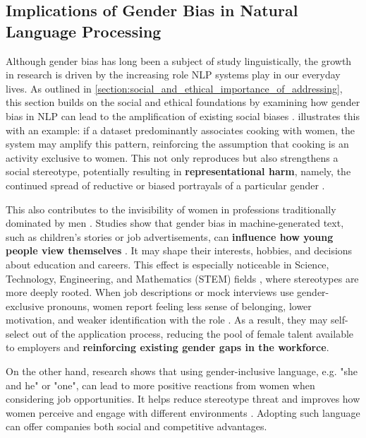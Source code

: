 \subsection{Implications of Gender Bias in Natural Language Processing}
Although gender bias has long been a subject of study linguistically, the growth in research is driven by the increasing role NLP systems play in our everyday lives. As outlined in \autoref{section:social_and_ethical_importance_of_addressing}, this section builds on the social and ethical foundations by examining how gender bias in NLP can lead to the amplification of existing social biases \citep{rescignoGenderBiasMachine2023}.
\citet{ullmannGenderBiasMachine2022} illustrates this with an example: if a dataset predominantly associates cooking with women, the system may amplify this pattern, reinforcing the assumption that cooking is an activity exclusive to women. This not only reproduces but also strengthens a social stereotype, potentially resulting in \textbf{representational harm}, namely, the continued spread of reductive or biased portrayals of a particular gender \citep{stanczakSurveyGenderBias2021}. 

This also contributes to the invisibility of women in professions traditionally dominated by men \citep{kapplAreAllSpanish2025}. Studies show that gender bias in machine-generated text, such as children's stories or job advertisements, can \textbf{influence how young people view themselves} \citep{soundararajanInvestigatingGenderBias2024,kapplAreAllSpanish2025}. It may shape their interests, hobbies, and decisions about education and careers. This effect is especially noticeable in Science, Technology, Engineering, and Mathematics (STEM) fields \citep{pratesAssessingGenderBias2019}, where stereotypes are more deeply rooted. When job descriptions or mock interviews use gender-exclusive pronouns, women report feeling less sense of belonging, lower motivation, and weaker identification with the role \citep{godsilEffectsGenderRoles2016}. As a result, they may self-select out of the application process, reducing the pool of female talent available to employers and \textbf{reinforcing existing gender gaps in the workforce}.

On the other hand, research shows that using gender-inclusive language, e.g. "she and he" or "one", can lead to more positive reactions from women when considering job opportunities. It helps reduce stereotype threat and improves how women perceive and engage with different environments \citep{ godsilEffectsGenderRoles2016}. Adopting such language can offer companies both social and competitive advantages.


